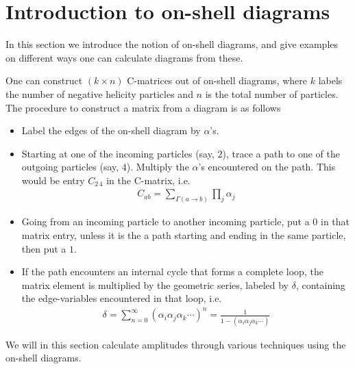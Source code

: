 \documentclass[letter,11pt]{article}
\begin{document}
\section{Introduction to on-shell diagrams}
In this section we introduce the notion of on-shell diagrams, and give examples on different ways one can calculate diagrams from these. 

One can construct $(k\times n)$ C-matrices out of on-shell diagrams, where $k$ labels the number of negative helicity particles and $n$ is the total number of particles. The procedure to construct a matrix from a diagram is as follows
\begin{itemize}
	\item Label the edges of the on-shell diagram by $\alpha$'s.
	\item Starting at one of the incoming particles (say, $2$), trace a path to one of the outgoing particles  (say, $4$). Multiply the $\alpha$'s encountered on the path. This would be entry $C_{2\,4}$ in the C-matrix, i.e.
	\begin{equation}
		\begin{aligned}
			C_{ab}=\sum_{\Gamma(a\to b)}\prod_j\alpha_j
		\end{aligned}
	\end{equation}
	\item Going from an incoming particle to another incoming particle, put a $0$ in that matrix entry, unless it is the a path starting and ending in the same particle, then put a $1$.
	\item If the path encounters an internal cycle that forms a complete loop, the matrix element is multiplied by the geometric series, labeled by $\delta$, containing the edge-variables encountered in that loop, i.e.
	\begin{equation}
		\begin{aligned}
			\delta=\sum_{n=0}^\infty (\alpha_i \alpha_j\alpha_k \cdots)^n=\frac{1}{1- (\alpha_i \alpha_j\alpha_k \cdots)}
		\end{aligned}
	\end{equation}
\end{itemize} 
We will in this section calculate amplitudes through various techniques using the on-shell diagrams.
\end{document}
